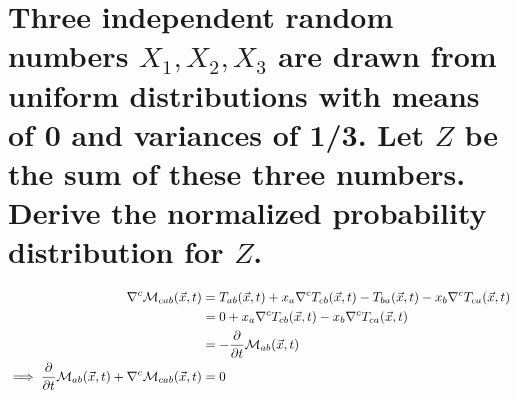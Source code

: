 \section{Three independent random numbers $X_1, X_2, X_3$ are drawn
from uniform distributions with means of 0 and variances of 1/3.
Let $Z$ be the sum of these three numbers.
Derive the normalized probability distribution for $Z$.}

\begin{align*}
    \nabla^c \mathcal{M}_{cab}(\vec{x}, t) 
    &= T_{ab}(\vec{x}, t) + x_a \nabla^c T_{cb}(\vec{x}, t) - T_{ba}(\vec{x}, t) - x_b \nabla^c T_{ca}(\vec{x}, t) \\
    &= 0 + x_a \nabla^c T_{cb}(\vec{x}, t) - x_b \nabla^c T_{ca}(\vec{x}, t) \\
    &= - \frac{\partial}{\partial t}\mathcal{M}_{ab}(\vec{x}, t) \\
    \implies \frac{\partial}{\partial t}\mathcal{M}_{ab}(\vec{x}, t) + \nabla^c \mathcal{M}_{cab}(\vec{x}, t) 
    &= 0 \\
\end{align*}

